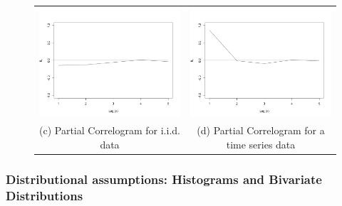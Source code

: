 \begin{figure}
\begin{center}
\begin{tabular}{cc}
\includegraphics[scale=0.25]{./figures/PartialCorrelogramGaussian} &
\includegraphics[scale=0.25]{./figures/PartialCorrelogramTimeSerie} \\
(c) Partial Correlogram for i.i.d. data & (d) Partial Correlogram for a time series data \\
\end{tabular}
\end{center}
\end{figure}




\subsubsection*{Distributional assumptions: Histograms and Bivariate Distributions}

